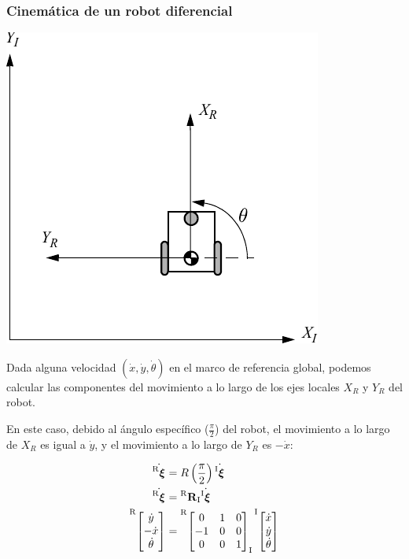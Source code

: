 \begin{frame}
    \frametitle{Cinemática de un robot diferencial}
	\scriptsize
    \begin{center}
        \includegraphics[width=0.2\columnwidth]{./images/coordinate_frame_rotation.pdf}
    \end{center}

    Dada alguna velocidad $(\dot{x}, \dot{y}, \dot{\theta})$ en el marco de referencia global, podemos calcular las componentes del movimiento a lo largo de los ejes locales $X_R$ y $Y_R$ del robot.
    
    En este caso, debido al ángulo específico ($\frac{\pi}{2}$) del robot, el movimiento a lo largo de $X_R$ es igual a $\dot{y}$, y el movimiento a lo largo de $Y_R$ es $-\dot{x}$:

    \begin{align*}
        \dot{\transform{R}{}} &= 
        R\left(\dfrac{\pi}{2}\right)\dot{\transform{I}{}}\\
        \dot{\transform{R}{}} &= 
        \rotationCoord{R}{I}\dot{\transform{I}{}}\\
        \toCoord{\begin{bmatrix}
        			\dot{y}\\
        			-\dot{x}\\
        			\dot{\theta}
         		 \end{bmatrix}}{R}
        &=
        \fromCoord{\toCoord{\begin{bmatrix}
        	0 & 1 & 0 \\
        	-1 & 0 & 0 \\
        	0 & 0 & 1
        \end{bmatrix}}{R}}{I}
        \toCoord{\begin{bmatrix}
        			\dot{x}\\
        			\dot{y}\\
        			\dot{\theta}
        		 \end{bmatrix}}{I}
    \end{align*}
\end{frame}

